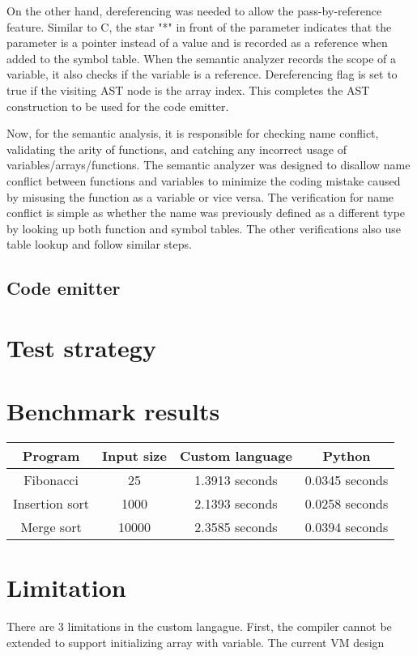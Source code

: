 \documentclass[manuscript,screen,nonacm]{acmart}
\begin{document}
On the other hand, dereferencing was needed to allow the pass-by-reference feature. Similar to C, the star "*" in front of the parameter indicates that the parameter is a pointer instead of a value and is recorded as a reference when added to the symbol table. When the semantic analyzer records the scope of a variable, it also checks if the variable is a reference. Dereferencing flag is set to true if the visiting AST node is the array index. This completes the AST construction to be used for the code emitter.

Now, for the semantic analysis, it is responsible for checking name conflict, validating the arity of functions, and catching any incorrect usage of variables/arrays/functions. The semantic analyzer was designed to disallow name conflict between functions and variables to minimize the coding mistake caused by misusing the function as a variable or vice versa. The verification for name conflict is simple as whether the name was previously defined as a different type by looking up both function and symbol tables. The other verifications also use table lookup and follow similar steps.

\subsection{Code emitter}


\section{Test strategy}


\section{Benchmark results}

\begin{center}
\begin{tabular}{|c|c|c|c|}
    \hline
    Program & Input size & Custom language & Python \\
    \hline
    Fibonacci & 25 & 1.3913 seconds & 0.0345 seconds \\
    Insertion sort & 1000 & 2.1393 seconds & 0.0258 seconds \\
    Merge sort & 10000 & 2.3585 seconds & 0.0394 seconds \\
    \hline
\end{tabular}
\end{center}

\section{Limitation}
There are 3 limitations in the custom langague. First, the compiler cannot be extended to support initializing array with variable. The current VM design 
\end{document}
